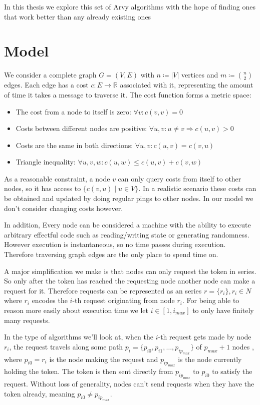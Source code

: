 \documentclass[a4paper, oneside]{discothesis}
\begin{document}
In this thesis we explore this set of Arvy algorithms with the hope of finding ones that work better than any already existing ones

\section{Model}
\label{model}

We consider a complete graph $G=(V,E)$ with $n\coloneqq|V|$ vertices and $m\coloneqq\binom{n}{2}$ edges. Each edge has a cost $c : E \rightarrow \mathbb{R}$ associated with it, representing the amount of time it takes a message to traverse it. The cost function forms a metric space:
\begin{itemize}
\item The cost from a node to itself is zero: $\forall v:c(v, v)=0$
\item Costs between different nodes are positive: $\forall u,v : u\neq v\Rightarrow c(u,v)>0$
\item Costs are the same in both directions: $\forall u,v : c(u,v)=c(v,u)$
\item Triangle inequality: $\forall u,v,w : c(u,w)\leq c(u,v)+c(v,w)$
\end{itemize}

As a reasonable constraint, a node $v$ can only query costs from itself to other nodes, so it has access to $\{c(v, u)\;|\;u\in V\}$. In a realistic scenario these costs can be obtained and updated by doing regular pings to other nodes. In our model we don't consider changing costs however.

In addition, Every node can be considered a machine with the ability to execute arbitrary effectful code such as reading/writing state or generating randomness. However execution is instantaneous, so no time passes during execution. Therefore traversing graph edges are the only place to spend time on.

A major simplification we make is that nodes can only request the token in series. So only after the token has reached the requesting node another node can make a request for it. Therefore requests can be represented as an series $r=\{r_i\},r_i\in N$ where $r_i$ encodes the $i$-th request originating from node $r_i$. For being able to reason more easily about execution time we let $i\in[1,i_{max}]$ to only have finitely many requests.

In the type of algorithms we'll look at, when the $i$-th request gets made by node $r_i$, the request travels along some path $p_i=\{p_{i0},p_{i1},\dots,p_{ip_{max}}\}$ of $p_{max}+1$ nodes , where $p_{i0}=r_i$ is the node making the request and $p_{ip_{max}}$ is the node currently holding the token. The token is then sent directly from $p_{ip_{max}}$ to $p_{i0}$ to satisfy the request. Without loss of generality, nodes can't send requests when they have the token already, meaning $p_{i0}\neq p_{ip_{max}}$.
\end{document}
